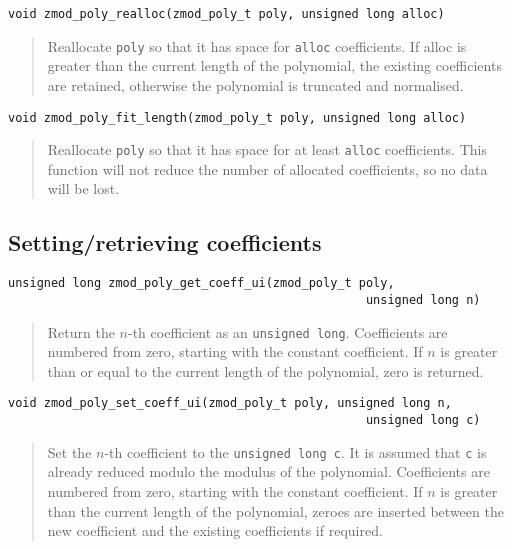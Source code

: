 \documentclass[a4paper,10pt]{article}
\newcommand{\code}{\lstinline}
\begin{document}
\begin{lstlisting}
void zmod_poly_realloc(zmod_poly_t poly, unsigned long alloc)
\end{lstlisting}
\begin{quote}
Reallocate \code{poly} so that it has space for \code{alloc} coefficients. If alloc is greater than the current length of the polynomial, the existing coefficients are retained, otherwise the polynomial is truncated and normalised.
\end{quote}

\begin{lstlisting}
void zmod_poly_fit_length(zmod_poly_t poly, unsigned long alloc)
\end{lstlisting}
\begin{quote}
Reallocate \code{poly} so that it has space for at least \code{alloc} coefficients. This function will not reduce the number of allocated coefficients, so no data will be lost.
\end{quote}

\subsection{Setting/retrieving coefficients}

\begin{lstlisting}
unsigned long zmod_poly_get_coeff_ui(zmod_poly_t poly, 
                                                  unsigned long n)
\end{lstlisting}
\begin{quote}
Return the $n$-th coefficient as an \code{unsigned long}. Coefficients are numbered from zero, starting with the constant coefficient. If $n$ is greater than or equal to the current length of the polynomial, zero is returned.
\end{quote}

\begin{lstlisting}
void zmod_poly_set_coeff_ui(zmod_poly_t poly, unsigned long n, 
                                                  unsigned long c)
\end{lstlisting}
\begin{quote}
Set the $n$-th coefficient to the \code{unsigned long c}. It is assumed that \code{c} is already reduced modulo the modulus of the polynomial. Coefficients are numbered from zero, starting with the constant coefficient. If $n$ is greater than the current length of the polynomial, zeroes are inserted between the new coefficient and the existing coefficients if required.
\end{quote}
\end{document}
